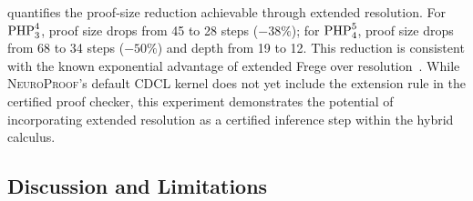 \documentclass[conference]{IEEEtran}
\newcommand{\NP}{\textsc{NeuroProof}}
\newcommand{\PHP}{\textnormal{PHP}}
\begin{document}
 quantifies the proof-size reduction
achievable through extended resolution.  For $\PHP_3^4$, proof
size drops from 45 to 28 steps ($-38\%$); for $\PHP_4^5$, proof
size drops from 68 to 34 steps ($-50\%$) and depth from 19 to
12.  This reduction is consistent with the known exponential
advantage of extended Frege over
resolution~\cite{CookReckhow1979,Krajicek1995}.  While \NP{}'s
default CDCL kernel does not yet include the extension rule in
the certified proof checker, this experiment demonstrates the
potential of incorporating extended resolution as a certified
inference step within the hybrid calculus.

\subsection{Discussion and Limitations}
\end{document}
